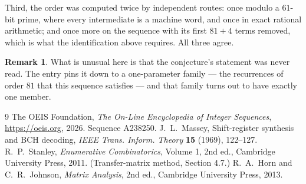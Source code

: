 \documentclass[11pt,a4paper]{article}
\theoremstyle{plain}
\theoremstyle{definition}
\newtheorem{remark}[theorem]{Remark}
\begin{document}
Third, the order was computed twice by independent routes: once modulo a $61$-bit prime, where
every intermediate is a machine word, and once in exact rational arithmetic; and once more on
the sequence with its first $81+4$ terms removed, which is what the identification above
requires. All three agree.

\begin{remark}
What is unusual here is that the conjecture's statement was never read. The entry pins it down
to a one-parameter family --- the recurrences of order $81$ that this sequence satisfies
--- and that family turns out to have exactly one member.
\end{remark}

\begin{thebibliography}{9}
 The OEIS Foundation, \emph{The On-Line Encyclopedia of Integer
Sequences}, \url{https://oeis.org}, 2026. Sequence A238250.
 J.~L.~Massey, Shift-register synthesis and BCH decoding, \emph{IEEE
Trans. Inform. Theory} \textbf{15} (1969), 122--127.
 R.~P.~Stanley, \emph{Enumerative Combinatorics}, Volume 1, 2nd ed.,
Cambridge University Press, 2011. (Transfer-matrix method, Section 4.7.)
 R.~A.~Horn and C.~R.~Johnson, \emph{Matrix Analysis}, 2nd ed., Cambridge
University Press, 2013.
\end{thebibliography}
\end{document}

